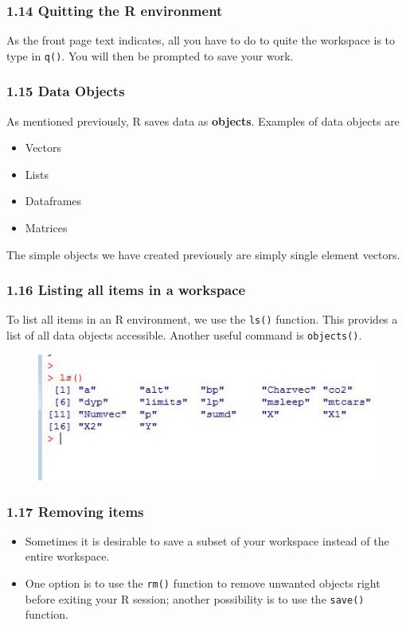 \documentclass{beamer}
\begin{document}
 	\begin{frame}
 		\frametitle{1.14 Quitting the R environment}
 		As the front page text indicates, all you have to do to quite the workspace is to type in \texttt{q()}.
 		You will then be prompted to save your work.
 	\end{frame}
 	\begin{frame}
 		\frametitle{1.15 Data Objects}
 		As mentioned previously, R saves data as \textbf{objects}. Examples of data objects are
 		\begin{itemize}
 			\item Vectors
 			\item Lists
 			\item Dataframes
 			\item Matrices
 		\end{itemize}
 		The simple objects we have created previously are simply single element vectors.
 	\end{frame}
 	\begin{frame}
 		\frametitle{1.16 Listing all items in a workspace}
 		To list all items in an R environment, we use the \texttt{ls()} function. This provides a list of all data
 		objects accessible. Another useful command is \texttt{objects()}.
 		\begin{figure}
 			\centering
 			\includegraphics[width=1.2\linewidth]{images/ObjectsList}
 		\end{figure}
 		
 	\end{frame}
 	\begin{frame}
 		\frametitle{1.17 Removing items}
 		\begin{itemize}
 			\item Sometimes it is desirable to save a subset of your workspace instead of the entire workspace.
 			\item One option is to use the \texttt{rm()} function to remove unwanted objects right before exiting your R
 			session; another possibility is to use the \texttt{save()} function.
 		\end{itemize}
 	\end{frame}
\end{document}
